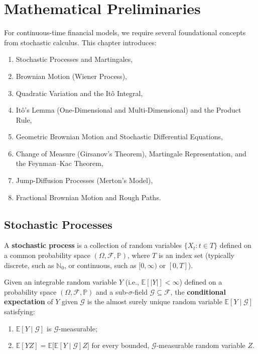 \chapter{Mathematical Preliminaries}
\label{ch:math-preliminaries}

For continuous-time financial models, we require several foundational concepts from stochastic calculus. This chapter introduces:
\begin{enumerate}
    \item Stochastic Processes and Martingales,
    \item Brownian Motion (Wiener Process),
    \item Quadratic Variation and the It\^o Integral,
    \item It\^o's Lemma (One-Dimensional and Multi-Dimensional) and the Product Rule,
    \item Geometric Brownian Motion and Stochastic Differential Equations,
    \item Change of Measure (Girsanov's Theorem), Martingale Representation, and the Feynman--Kac Theorem,
    \item Jump-Diffusion Processes (Merton's Model),
    \item Fractional Brownian Motion and Rough Paths.
\end{enumerate}

\section{Stochastic Processes}

\begin{definition}
\label{def:stochastic-process}
A \textbf{stochastic process} is a collection of random variables $\{X_t : t \in T\}$ defined on a common probability space $(\Omega, \mathcal{F}, \mathbb{P})$, where $T$ is an index set (typically discrete, such as $\mathbb{N}_0$, or continuous, such as $[0, \infty)$ or $[0, T]$).
\end{definition}

\begin{definition}
\label{def:cond-exp}
Given an integrable random variable $Y$ (i.e., $\mathbb{E}[|Y|] < \infty$) defined on a probability space $(\Omega, \mathcal{F}, \mathbb{P})$ and a sub-$\sigma$-field $\mathcal{G} \subseteq \mathcal{F}$, the \textbf{conditional expectation} of $Y$ given $\mathcal{G}$ is the almost surely unique random variable $\mathbb{E}[Y \mid \mathcal{G}]$ satisfying:
\begin{enumerate}
    \item $\mathbb{E}[Y \mid \mathcal{G}]$ is $\mathcal{G}$-measurable;
    \item $\mathbb{E}[YZ] = \mathbb{E}\big[\mathbb{E}[Y \mid \mathcal{G}] Z\big]$ for every bounded, $\mathcal{G}$-measurable random variable $Z$.
\end{enumerate}
\end{definition}


